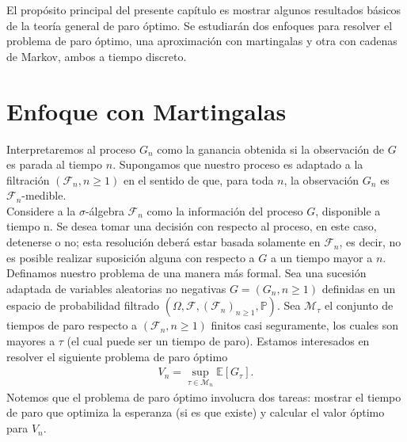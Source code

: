 El propósito principal del presente capítulo es mostrar algunos resultados básicos de la teoría general de paro óptimo. Se estudiarán dos enfoques para resolver el problema de paro óptimo, una aproximación con martingalas y otra con cadenas de Markov, ambos a tiempo discreto. 


\section{Enfoque con Martingalas}
Interpretaremos al proceso $G_n$ como la ganancia obtenida si la observación de $G$ es parada al tiempo $n$. Supongamos que nuestro proceso es adaptado a la filtración $(\mathcal{F}_n, n \geq 1)$ en el sentido de que, para toda $n$, la observación $G_n$ es $\mathcal{F}_n$-medible. \\

Considere a la $\sigma$-álgebra $\mathcal{F}_n$ como la información del proceso $G$, disponible a tiempo n. Se desea tomar una decisión con respecto al proceso, en este caso, detenerse o no; esta resolución deberá estar basada solamente en $\mathcal{F}_n$, es decir, no es posible realizar suposición alguna con respecto a $G$ a un tiempo mayor a $n$. \\

Definamos nuestro problema de una manera más formal. Sea una sucesión adaptada de variables aleatorias no negativas $G = (G_n, n \geq 1)$ definidas en un espacio de probabilidad filtrado $(\Omega, \mathcal{F}, (\mathcal{F}_n)_{n \geq 1}, \mathbb{P})$. Sea $\mathcal{M}_\tau$ el conjunto de tiempos de paro respecto a $(\mathcal{F}_n, n \geq 1)$ finitos casi seguramente, los cuales son mayores a $\tau$ (el cual puede ser un tiempo de paro). Estamos interesados en resolver el siguiente problema de paro óptimo
	\begin{align}
	V_n = \sup_{\tau \in \mathcal{M}_n} \mathbb{E}[G_\tau]. \label{abb}
	\end{align}
Notemos que el problema de paro óptimo involucra dos tareas: mostrar el tiempo de paro que optimiza la esperanza (si es que existe) y calcular el valor óptimo para $V_n$. \\

